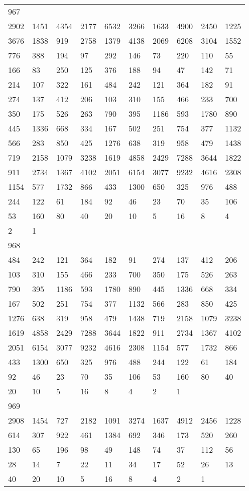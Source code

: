 \begin{longtable}{*{10}{l}}
967&&&&&&&&&\\
2902& 1451& 4354& 2177& 6532& 3266& 1633& 4900& 2450& 1225\\
3676& 1838& 919& 2758& 1379& 4138& 2069& 6208& 3104& 1552\\
776& 388& 194& 97& 292& 146& 73& 220& 110& 55\\
166& 83& 250& 125& 376& 188& 94& 47& 142& 71\\
214& 107& 322& 161& 484& 242& 121& 364& 182& 91\\
274& 137& 412& 206& 103& 310& 155& 466& 233& 700\\
350& 175& 526& 263& 790& 395& 1186& 593& 1780& 890\\
445& 1336& 668& 334& 167& 502& 251& 754& 377& 1132\\
566& 283& 850& 425& 1276& 638& 319& 958& 479& 1438\\
719& 2158& 1079& 3238& 1619& 4858& 2429& 7288& 3644& 1822\\
911& 2734& 1367& 4102& 2051& 6154& 3077& 9232& 4616& 2308\\
1154& 577& 1732& 866& 433& 1300& 650& 325& 976& 488\\
244& 122& 61& 184& 92& 46& 23& 70& 35& 106\\
53& 160& 80& 40& 20& 10& 5& 16& 8& 4\\
2& 1& \\

968&&&&&&&&&\\
484& 242& 121& 364& 182& 91& 274& 137& 412& 206\\
103& 310& 155& 466& 233& 700& 350& 175& 526& 263\\
790& 395& 1186& 593& 1780& 890& 445& 1336& 668& 334\\
167& 502& 251& 754& 377& 1132& 566& 283& 850& 425\\
1276& 638& 319& 958& 479& 1438& 719& 2158& 1079& 3238\\
1619& 4858& 2429& 7288& 3644& 1822& 911& 2734& 1367& 4102\\
2051& 6154& 3077& 9232& 4616& 2308& 1154& 577& 1732& 866\\
433& 1300& 650& 325& 976& 488& 244& 122& 61& 184\\
92& 46& 23& 70& 35& 106& 53& 160& 80& 40\\
20& 10& 5& 16& 8& 4& 2& 1& \\

969&&&&&&&&&\\
2908& 1454& 727& 2182& 1091& 3274& 1637& 4912& 2456& 1228\\
614& 307& 922& 461& 1384& 692& 346& 173& 520& 260\\
130& 65& 196& 98& 49& 148& 74& 37& 112& 56\\
28& 14& 7& 22& 11& 34& 17& 52& 26& 13\\
40& 20& 10& 5& 16& 8& 4& 2& 1& \\


\end{longtable}
